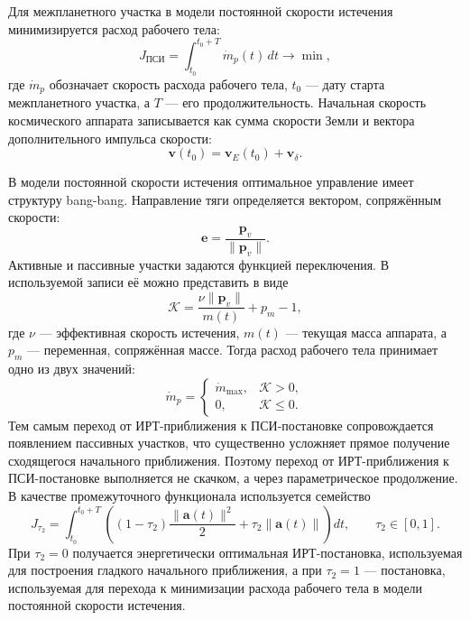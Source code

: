 Для межпланетного участка в модели постоянной скорости истечения минимизируется расход рабочего тела:
\begin{equation}
	J_{\text{ПСИ}}
	=
	\int_{t_0}^{t_0+T} \dot m_p(t)\,dt
	\rightarrow
	\min ,
\end{equation}
где \(\dot m_p\) обозначает скорость расхода рабочего тела, \(t_0\) --- дату старта межпланетного участка, а \(T\) --- его продолжительность. Начальная скорость космического аппарата записывается как сумма скорости Земли и вектора дополнительного импульса скорости:
\begin{equation}
	\mathbf v(t_0)
	=
	\mathbf v_E(t_0)
	+
	\mathbf v_\delta .
	\label{eq:ch4_venus_initial_velocity_with_vinf}
\end{equation}

В модели постоянной скорости истечения оптимальное управление имеет структуру bang-bang. Направление тяги определяется вектором, сопряжённым скорости:
\begin{equation}
	\mathbf e
	=
	\frac{\mathbf p_v}{\|\mathbf p_v\|}.
\end{equation}
Активные и пассивные участки задаются функцией переключения. В используемой записи её можно представить в виде
\begin{equation}
	\mathcal K
	=
	\frac{\nu\|\mathbf p_v\|}{m(t)}
	+
	p_m
	-
	1 ,
\end{equation}
где \(\nu\) --- эффективная скорость истечения, \(m(t)\) --- текущая масса аппарата, а \(p_m\) --- переменная, сопряжённая массе. Тогда расход рабочего тела принимает одно из двух значений:
\begin{equation}
	\dot m_p
	=
	\begin{cases}
		\dot m_{\max}, & \mathcal K>0,\\
		0, & \mathcal K\leq 0.
	\end{cases}
\end{equation}
Тем самым переход от ИРТ-приближения к ПСИ-постановке сопровождается появлением пассивных участков, что существенно усложняет прямое получение сходящегося начального приближения.
Поэтому переход от ИРТ-приближения к ПСИ-постановке выполняется не скачком, а через параметрическое продолжение. В качестве промежуточного функционала используется семейство
\begin{equation}
	J_{\tau_2}
	=
	\int_{t_0}^{t_0+T}
	\left(
	(1-\tau_2)\frac{\|\mathbf a(t)\|^2}{2}
	+
	\tau_2\|\mathbf a(t)\|
	\right)dt,
	\qquad
	\tau_2\in[0,1].
	\label{eq:ch4_psi_functional_continuation}
\end{equation}
При \(\tau_2=0\) получается энергетически оптимальная ИРТ-постановка, используемая для построения гладкого начального приближения, а при \(\tau_2=1\) --- постановка, используемая для перехода к минимизации расхода рабочего тела в модели постоянной скорости истечения.

